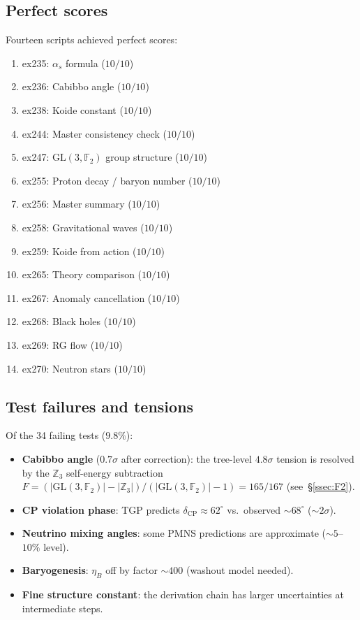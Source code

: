 \documentclass[aps,prd,twocolumn,superscriptaddress,showpacs,
  nofootinbib,floatfix,longbibliography]{revtex4-2}
\newcommand{\GL}{\mathrm{GL}(3,\mathbb{F}_2)}
\newcommand{\as}{\alpha_s}
\newcommand{\ZZ}{\mathbb{Z}}
\begin{document}
\subsection{Perfect scores}\label{ssec:perfect}

Fourteen scripts achieved perfect scores:
\begin{enumerate}
\item ex235: $\as$ formula ($10/10$)
\item ex236: Cabibbo angle ($10/10$)
\item ex238: Koide constant ($10/10$)
\item ex244: Master consistency check ($10/10$)
\item ex247: $\GL$ group structure ($10/10$)
\item ex255: Proton decay / baryon number ($10/10$)
\item ex256: Master summary ($10/10$)
\item ex258: Gravitational waves ($10/10$)
\item ex259: Koide from action ($10/10$)
\item ex265: Theory comparison ($10/10$)
\item ex267: Anomaly cancellation ($10/10$)
\item ex268: Black holes ($10/10$)
\item ex269: RG flow ($10/10$)
\item ex270: Neutron stars ($10/10$)
\end{enumerate}


\subsection{Test failures and tensions}\label{ssec:failures}

Of the 34 failing tests ($9.8\%$):
\begin{itemize}
\item \textbf{Cabibbo angle} ($0.7\sigma$ after correction): the tree-level
  $4.8\sigma$ tension is resolved by the $\ZZ_3$ self-energy subtraction
  $F = (|\GL| - |\ZZ_3|)/(|\GL| - 1) = 165/167$ (see~\S\ref{ssec:F2}).
\item \textbf{CP violation phase}: TGP predicts
  $\delta_\mathrm{CP} \approx 62^\circ$ vs.\ observed $\sim 68^\circ$
  ($\sim 2\sigma$).
\item \textbf{Neutrino mixing angles}: some PMNS predictions are
  approximate ($\sim 5$--$10\%$ level).
\item \textbf{Baryogenesis}: $\eta_B$ off by factor $\sim 400$
  (washout model needed).
\item \textbf{Fine structure constant}: the derivation chain has
  larger uncertainties at intermediate steps.
\end{itemize}
\end{document}
